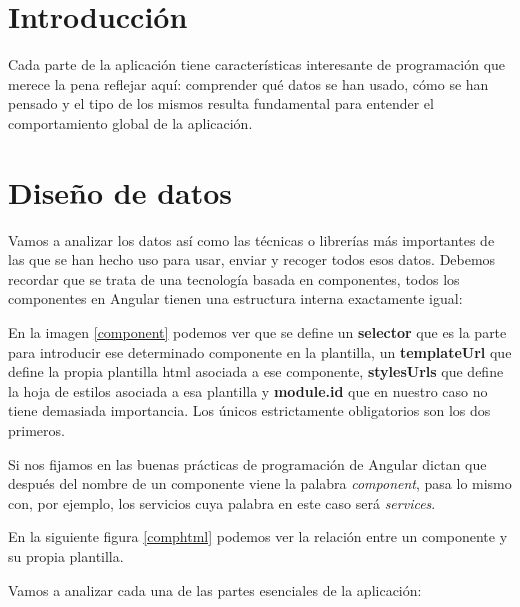 \section{Introducción}\label{introducciondiseno}
Cada parte de la aplicación tiene características interesante de programación que merece la pena reflejar aquí: comprender qué datos se han usado, cómo se han pensado y el tipo de los mismos resulta fundamental para entender el comportamiento global de la aplicación.

\section{Diseño de datos}\label{datos}
Vamos a analizar los datos así como las técnicas o librerías más importantes de las que se han hecho uso para usar, enviar y recoger todos esos datos. Debemos recordar que se trata de una tecnología basada en componentes, todos los componentes en Angular tienen una estructura interna exactamente igual:

\label{component}

En la  imagen \ref{component} podemos ver que se define un \textbf{selector} que es la parte para introducir ese determinado componente en la plantilla, un \textbf{templateUrl} que define la propia plantilla html asociada a ese componente, \textbf{stylesUrls} que define la hoja de estilos asociada a esa plantilla y \textbf{module.id} que en nuestro caso no tiene demasiada importancia.  Los únicos estrictamente obligatorios son los dos primeros.

Si nos fijamos en las buenas prácticas de programación de Angular dictan que después del nombre de un componente viene la palabra \emph{component}, pasa lo mismo con, por ejemplo, los servicios cuya palabra en este caso será \emph{services}.

En la siguiente figura \ref{comphtml} podemos ver la relación entre un componente y su propia plantilla.

\label{comphtml}


Vamos a analizar cada una de las partes esenciales de la aplicación:



